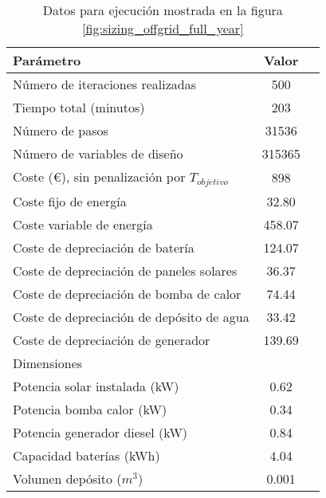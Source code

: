 \begin{table}[ht]
	\centering
	\caption{Datos para ejecución mostrada en la figura \ref{fig:sizing_offgrid_full_year}}
	\label{tab:sizing_offgrid_full_year}
	\begin{tabular}{@{}lcc@{}}
		\toprule
		Parámetro                                      & Valor  \\
		\midrule
		Número de iteraciones realizadas               & 500    \\
		Tiempo total (minutos)                         & 203    \\
		Número de pasos                                & 31536  \\
		Número de variables de diseño                  & 315365 \\
		\midrule
		Coste (€), sin penalización por $T_{objetivo}$ & 898    \\
		\midrule
		Coste fijo de energía                          & 32.80  \\
		Coste variable de energía                      & 458.07 \\
		Coste de depreciación de batería               & 124.07 \\
		Coste de depreciación de paneles solares       & 36.37  \\
		Coste de depreciación de bomba de calor        & 74.44  \\
		Coste de depreciación de depósito de agua      & 33.42  \\
		Coste de depreciación de generador             & 139.69 \\
		\midrule
		Dimensiones                                    &        \\
		\midrule
		Potencia solar instalada (kW)                  & 0.62   \\
		Potencia bomba calor (kW)                      & 0.34   \\
		Potencia generador diesel (kW)                 & 0.84   \\
		Capacidad baterías (kWh)                       & 4.04   \\
		Volumen depósito ($m^3$)                       & 0.001  \\
		\bottomrule
	\end{tabular}
\end{table}
